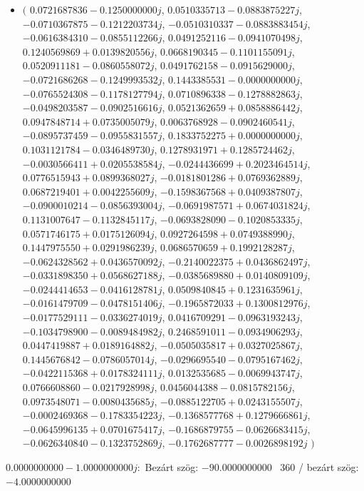 \documentclass[14pt,a4paper]{article}
\begin{document}
\begin{itemize}
\item
$\big($
$0.0721687836-0.1250000000j$, $0.0510335713-0.0883875227j$, $-0.0710367875-0.1212203734j$, $-0.0510310337-0.0883883454j$, $-0.0616384310-0.0855112266j$, $0.0491252116-0.0941070498j$, $0.1240569869+0.0139820556j$, $0.0668190345-0.1101155091j$, $0.0520911181-0.0860558072j$, $0.0491762158-0.0915629000j$, $-0.0721686268-0.1249993532j$, $0.1443385531-0.0000000000j$, $-0.0765524308-0.1178127794j$, $0.0710896338-0.1278882863j$, $-0.0498203587-0.0902516616j$, $0.0521362659+0.0858886442j$, $0.0947848714+0.0735005079j$, $0.0063768928-0.0902460541j$, $-0.0895737459-0.0955831557j$, $0.1833752275+0.0000000000j$, $0.1031121784-0.0346489730j$, $0.1278931971+0.1285724462j$, $-0.0030566411+0.0205538584j$, $-0.0244436699+0.2023464514j$, $0.0776515943+0.0899368027j$, $-0.0181801286+0.0769362889j$, $0.0687219401+0.0042255609j$, $-0.1598367568+0.0409387807j$, $-0.0900010214-0.0856393004j$, $-0.0691987571+0.0674031824j$, $0.1131007647-0.1132845117j$, $-0.0693828090-0.1020853335j$, $0.0571746175+0.0175126094j$, $0.0927264598+0.0749388990j$, $0.1447975550+0.0291986239j$, $0.0686570659+0.1992128287j$, $-0.0624328562+0.0436570092j$, $-0.2140022375+0.0436862497j$, $-0.0331898350+0.0568627188j$, $-0.0385689880+0.0140809109j$, $-0.0244414653-0.0416128781j$, $0.0509840845+0.1231635961j$, $-0.0161479709-0.0478151406j$, $-0.1965872033+0.1300812976j$, $-0.0177529111-0.0336274019j$, $0.0416709291-0.0963193243j$, $-0.1034798900-0.0089484982j$, $0.2468591011-0.0934906293j$, $0.0447419887+0.0189164882j$, $-0.0505035817+0.0327025867j$, $0.1445676842-0.0786057014j$, $-0.0296695540-0.0795167462j$, $-0.0422115368+0.0178324111j$, $0.0132535685-0.0069943747j$, $0.0766608860-0.0217928998j$, $0.0456044388-0.0815782156j$, $0.0973548071-0.0080435685j$, $-0.0885122705+0.0243155507j$, $-0.0002469368-0.1783354223j$, $-0.1368577768+0.1279666861j$, $-0.0645996135+0.0701675417j$, $-0.1686879755-0.0626683415j$, $-0.0626340840-0.1323752869j$, $-0.1762687777-0.0026898192j$
$\big)$
\end{itemize}
$0.0000000000-1.0000000000j$:\
Bezárt szög: $-90.0000000000$ \
360 / bezárt szög: $-4.0000000000$\
\end{document}

